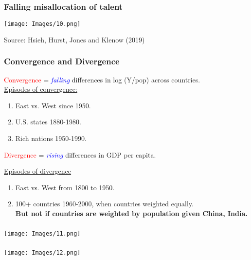 \documentclass[serif,professionalfont,red,aspectratio=169]{beamer}
\begin{document}
\begin{frame}[t]
\frametitle{Falling misallocation of talent}
\begin{center}
\texttt{[image: Images/10.png]}
\end{center}
\small{Source: Hsieh, Hurst, Jones and Klenow (2019)}
\end{frame}
\begin{frame}[t]
\frametitle{Convergence and Divergence}
\vspace{2mm}
\textcolor{red}{Convergence} =  \textit{\textcolor{blue}{falling}} differences in log (Y/pop) across countries.\\ 
\vspace{4mm}
\underline{Episodes of convergence:} 
\vspace{2mm}
\begin{enumerate}
\item East vs. West since 1950.
\item U.S. states 1880-1980. 
\item Rich nations 1950-1990.
\end{enumerate}
\vspace{4mm}
\textcolor{red}{Divergence} =  \textit{\textcolor{blue}{rising}} differences in GDP per capita.
\vspace{4mm}

\underline{Episodes of divergence} 
\vspace{2mm}
\begin{enumerate}
\item East vs. West from 1800 to 1950. 
\item 100+ countries 1960-2000, when countries weighted equally.\\ 
\textbf{But not if countries are weighted by population given China, India.}
\end{enumerate}
\end{frame}
\begin{frame}[t]
\frametitle{}
\begin{center}
\texttt{[image: Images/11.png]}
\end{center}
\end{frame}
\begin{frame}[t]
\frametitle{}
\begin{center}
\texttt{[image: Images/12.png]}
\end{center}
\end{frame}
\end{document}
